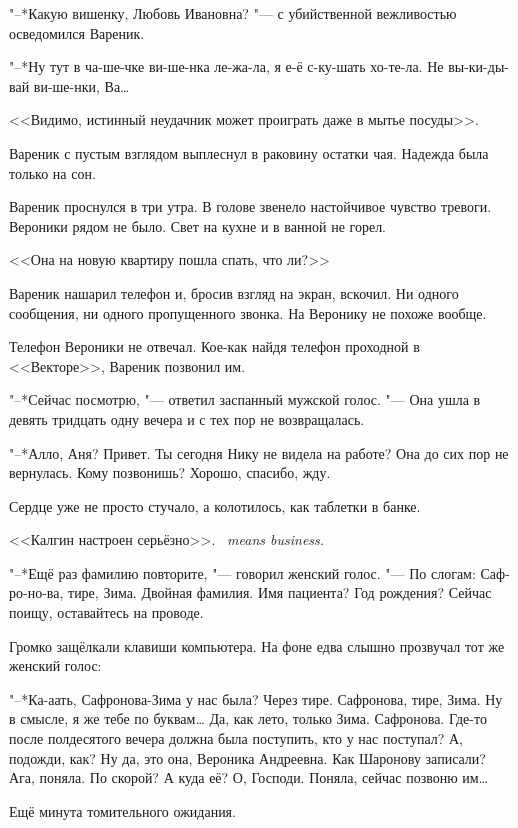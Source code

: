 "--*Какую вишенку, Любовь Ивановна? "--- с убийственной вежливостью осведомился Вареник.

"--*Ну тут в ча-ше-чке ви-ше-нка ле-жа-ла, я е-ё с-ку-шать хо-те-ла.
Не вы-ки-ды-вай ви-ше-нки, Ва\ldots{}

<<Видимо, истинный неудачник может проиграть даже в мытье посуды>>.

Вареник с пустым взглядом выплеснул в раковину остатки чая.
Надежда была только на сон.

\asterism

\label{Mon_2012_06_11}

Вареник проснулся в три утра.
В голове звенело настойчивое чувство тревоги.
Вероники рядом не было.
Свет на кухне и в ванной не горел.

<<Она на новую квартиру пошла спать, что ли?>>

Вареник нашарил телефон и, бросив взгляд на экран, вскочил.
Ни одного сообщения, ни одного пропущенного звонка.
На Веронику не похоже вообще.

Телефон Вероники не отвечал.
Кое-как найдя телефон проходной в <<Векторе>>, Вареник позвонил им.

"--*Сейчас посмотрю, "--- ответил заспанный мужской голос.
"--- Она ушла в девять тридцать одну вечера и с тех пор не возвращалась.

"--*Алло, Аня?
Привет.
Ты сегодня Нику не видела на работе?
Она до сих пор не вернулась.
Кому позвонишь?
Хорошо, спасибо, жду.

Сердце уже не просто стучало, а колотилось, как таблетки в банке.

{<<Калгин настроен серьёзно>>.}
{\textit{\Kalgin\ means business.}}

"--*Ещё раз фамилию повторите, "--- говорил женский голос.
"--- По слогам: Саф-ро-но-ва, тире, Зима.
Двойная фамилия.
Имя пациента?
Год рождения?
Сейчас поищу, оставайтесь на проводе.

Громко защёлкали клавиши компьютера.
На фоне едва слышно прозвучал тот же женский голос:

"--*Ка-аать, Сафронова-Зима у нас была?
Через тире.
Сафронова, тире, Зима.
Ну в смысле, я же тебе по буквам\ldots{}
Да, как лето, только Зима.
Сафронова.
Где-то после полдесятого вечера должна была поступить, кто у нас поступал?
А, подожди, как?
Ну да, это она, Вероника Андреевна.
Как Шаронову записали?
Ага, поняла.
По скорой?
А куда её?
О, Господи.
Поняла, сейчас позвоню им\ldots{}

Ещё минута томительного ожидания.

